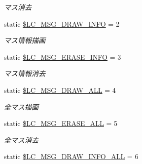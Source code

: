 \begin{DoxyCompactItemize}
\begin{DoxyCompactList}\small\item\em マス消去 \end{DoxyCompactList}\item 
static \hyperlink{class_reversi_const_a522738851ab060cd14ce3ffa1618000e}{\$\+L\+C\+\_\+\+M\+S\+G\+\_\+\+D\+R\+A\+W\+\_\+\+I\+N\+FO} = 2\hypertarget{class_reversi_const_a522738851ab060cd14ce3ffa1618000e}{}\label{class_reversi_const_a522738851ab060cd14ce3ffa1618000e}

\begin{DoxyCompactList}\small\item\em マス情報描画 \end{DoxyCompactList}\item 
static \hyperlink{class_reversi_const_a8ad50be0a297eea01df37fd8ba20d353}{\$\+L\+C\+\_\+\+M\+S\+G\+\_\+\+E\+R\+A\+S\+E\+\_\+\+I\+N\+FO} = 3\hypertarget{class_reversi_const_a8ad50be0a297eea01df37fd8ba20d353}{}\label{class_reversi_const_a8ad50be0a297eea01df37fd8ba20d353}

\begin{DoxyCompactList}\small\item\em マス情報消去 \end{DoxyCompactList}\item 
static \hyperlink{class_reversi_const_a3074235c57b33980f06e0ec357302e87}{\$\+L\+C\+\_\+\+M\+S\+G\+\_\+\+D\+R\+A\+W\+\_\+\+A\+LL} = 4\hypertarget{class_reversi_const_a3074235c57b33980f06e0ec357302e87}{}\label{class_reversi_const_a3074235c57b33980f06e0ec357302e87}

\begin{DoxyCompactList}\small\item\em 全マス描画 \end{DoxyCompactList}\item 
static \hyperlink{class_reversi_const_a6c2ec1c0d689ebe57d1ccd9eb9589da8}{\$\+L\+C\+\_\+\+M\+S\+G\+\_\+\+E\+R\+A\+S\+E\+\_\+\+A\+LL} = 5\hypertarget{class_reversi_const_a6c2ec1c0d689ebe57d1ccd9eb9589da8}{}\label{class_reversi_const_a6c2ec1c0d689ebe57d1ccd9eb9589da8}

\begin{DoxyCompactList}\small\item\em 全マス消去 \end{DoxyCompactList}\item 
static \hyperlink{class_reversi_const_a878b3d361d535e996827103efecdbfa3}{\$\+L\+C\+\_\+\+M\+S\+G\+\_\+\+D\+R\+A\+W\+\_\+\+I\+N\+F\+O\+\_\+\+A\+LL} = 6\hypertarget{class_reversi_const_a878b3d361d535e996827103efecdbfa3}{}\label{class_reversi_const_a878b3d361d535e996827103efecdbfa3}


\end{DoxyCompactItemize}
